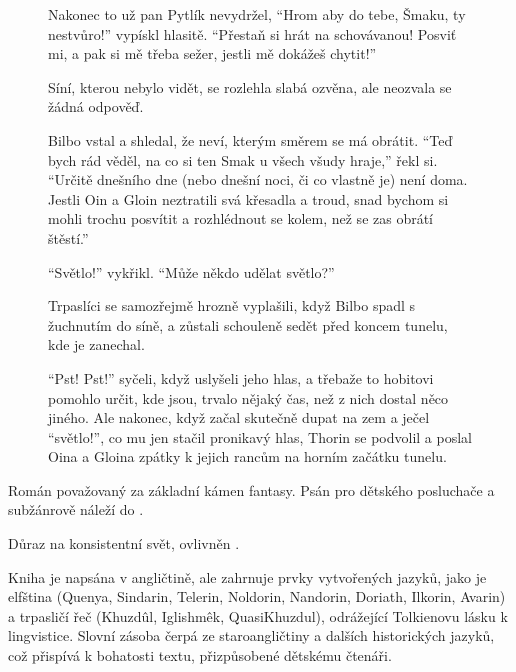 \documentclass[FGBook.tex]{subfiles}
\begin{document}

\noindent\begin{figure}\footnotesize
{}
\setlength{\parindent}{3pt}
Nakonec to už pan Pytlík nevydržel,
\enquote{Hrom aby do tebe, Šmaku, ty nestvůro!} vypískl hlasitě.
\enquote{Přestaň si hrát na schovávanou!
Posviť mi, a pak si mě třeba sežer, jestli mě dokážeš chytit!}\par
Síní, kterou nebylo vidět, se rozlehla slabá ozvěna, ale neozvala se žádná odpověď.\par
Bilbo vstal a shledal, že neví, kterým směrem se má obrátit.
\enquote{Teď bych rád věděl, na co si ten Smak u všech všudy hraje,} řekl si. 
\enquote{Určitě dnešního dne (nebo dnešní noci, či co vlastně je) není doma.
Jestli Oin a Gloin neztratili svá křesadla a troud,
snad bychom si mohli trochu posvítit a rozhlédnout se kolem, než se zas obrátí štěstí.}\par
\enquote{Světlo!} vykřikl. \enquote{Může někdo udělat světlo?}\par
Trpaslíci se samozřejmě hrozně vyplašili, když Bilbo spadl s žuchnutím do síně,
a zůstali schouleně sedět před koncem tunelu, kde je zanechal.\par
\enquote{Pst! Pst!} syčeli, když uslyšeli jeho hlas,
a třebaže to hobitovi pomohlo určit, kde jsou, trvalo nějaký čas,
než z nich dostal něco jiného.
Ale nakonec, když začal skutečně dupat na zem a ječel \enquote{světlo!},
co mu jen stačil pronikavý hlas, Thorin se podvolil
a poslal Oina a Gloina zpátky k jejich rancům na horním začátku tunelu.\par
\end{figure}


\noindent Román považovaný za základní kámen fantasy.
Psán pro dětského posluchače a subžánrově náleží do .

\noindent Důraz na konsistentní svět, ovlivněn .

\noindent Kniha je napsána v angličtině, ale zahrnuje prvky vytvořených jazyků,
jako je elfština (Quenya, Sindarin, Telerin, Noldorin, Nandorin, Doriath, Ilkorin, Avarin)
a trpasličí řeč (Khuzdûl, Iglishmêk, QuasiKhuzdul), odrážející Tolkienovu lásku k lingvistice.
Slovní zásoba čerpá ze staroangličtiny a dalších historických jazyků, což přispívá k bohatosti textu,
přizpůsobené dětskému čtenáři.
\end{document}
